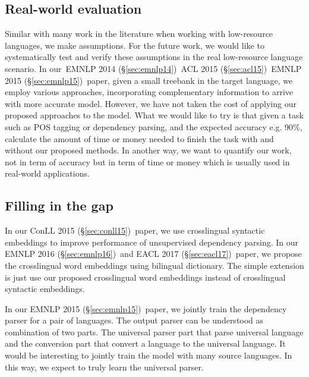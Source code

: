 \documentclass[12pt,twoside,final,hidelinks]{ltthesis}
\theoremstyle{definition}
\newcommand\emnlpiv{EMNLP 2014 (\S\ref{sec:emnlp14})}
\newcommand\conllv{ConLL 2015 (\S\ref{sec:conll15})}
\newcommand\aclv{ACL 2015 (\S\ref{sec:acl15})}
\newcommand\emnlpv{EMNLP 2015 (\S\ref{sec:emnlp15})}
\newcommand\emnlpvi{EMNLP 2016 (\S\ref{sec:emnlp16})}
\newcommand\eaclvii{EACL 2017 (\S\ref{sec:eacl17})}
\begin{document}
\subsection{Real-world evaluation}
Similar with many work in the literature when working with low-resource languages, we make assumptions. 
For the future work, we would like to systematically test and verify these assumptions in the real low-resource language scenario.
In our~\emnlpiv\, \aclv\, \emnlpv\ paper, given a small treebank in the target language, we employ various approaches, incorporating 
complementary information to arrive with more accurate model. However, we have not taken the cost of applying our proposed approaches to 
the model. %
What we would like to try is that given a task such as POS tagging or dependency parsing, and the expected accuracy e.g. 90\%, calculate the amount 
of time or money needed to finish the task with and without our proposed methods. In another way, we want to quantify our work, not in term 
of accuracy but in term of time or money which is usually used in real-world applications. 

\subsection{Filling in  the gap}
In our \conllv\ paper, we use crosslingual syntactic embeddings to improve performance of unsupervised dependency parsing. In our \emnlpvi\ and \eaclvii\ paper, 
we propose the crosslingual word embeddings using bilingual dictionary. The simple extension is just use our proposed crosslingual word embeddings instead of 
crosslingual syntactic embeddings. 

In our \emnlpv\ paper, we jointly train the dependency parser for a pair of languages. The output parser can be understood as combination of two parts. The universal
parser part that parse universal language and the conversion part that convert a language to the universal language. It would be interesting to jointly train the model with many source languages. In this way, we expect to truly learn the universal parser. 
\end{document}
